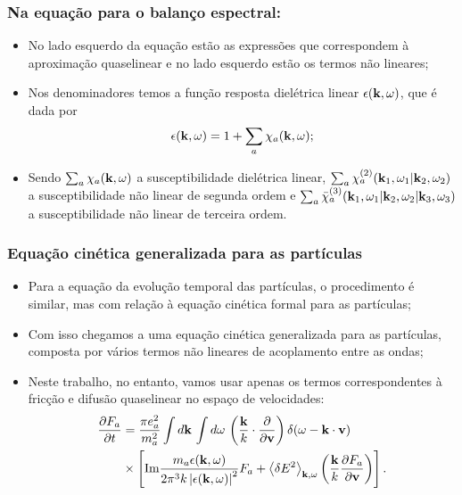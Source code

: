 \documentclass[10pt,aspectratio=1610,lualatex]{beamer}
\begin{document}
\begin{frame}
  \frametitle{Na equação para o balanço espectral:}
  \begin{itemize}
    \item No lado esquerdo da equação estão as expressões que correspondem
    à aproximação quaselinear e no lado esquerdo estão os termos não lineares;
    \vspace{0.5cm}
    \item Nos denominadores temos a função resposta dielétrica linear
    $\epsilon({\bf k},\omega)$, que é dada por
    \begin{equation*}
      \epsilon({\bf k},\omega)=1+\sum_a\chi_a({\bf k},\omega);
    \end{equation*}
    \vspace{0.1cm}
    \item Sendo $\sum_a \chi_a({\bf k},\omega)$ a susceptibilidade dielétrica
    linear, $\sum_a \chi_a^{(2)}({\bf k}_1,\omega_1|{\bf k}_2,\omega_2)$ a
    susceptibilidade não linear de segunda ordem e
    $\sum_a \bar \chi_a^{(3)}({\bf k}_1,\omega_1|{\bf k}_2,\omega_2|{\bf k}_3,\omega_3)$
    a susceptibilidade não linear de terceira ordem.
  \end{itemize}
\end{frame}

\begin{frame}
  \frametitle{Equação cinética generalizada para as partículas}
  \begin{itemize}
    \item Para a equação da evolução temporal das partículas, o procedimento
    é similar, mas com relação à equação cinética formal para as partículas;
    \vspace{0.4cm}
    \pause
    \item Com isso chegamos a uma equação cinética generalizada para as
    partículas, composta por vários termos não lineares de acoplamento
    entre as ondas;
    \vspace{0.4cm}
    \pause
    \item Neste trabalho, no entanto, vamos usar apenas os termos correspondentes
    à fricção e difusão quaselinear no espaço de velocidades:
    \begin{equation*}
      \begin{split}
	\frac{\partial F_a}{\partial t}
	&=\frac{\pi e_a^2}{m_a^2}\int d{\bf k}\,\int d\omega\,
	\left( \frac{\bf k}{k}\cdot \frac{\partial}{\partial {\bf v}}
	\right)\delta(\omega -{\bf k \cdot v})\\
	&\times\left[\mbox{Im} \frac{m_a \epsilon({\bf k},\omega)}
	  {2\pi^3k \left|\epsilon ({\bf k},\omega) \right|^2 }F_a
	  +\left<\delta E^2\right>_{{\bf k},\omega}\left(\frac{\bf k}{k}
	    \frac{\partial F_a}{\partial \bf v}\right)\right].
      \end{split}
    \end{equation*}
  \end{itemize}
\end{frame}
\end{document}
